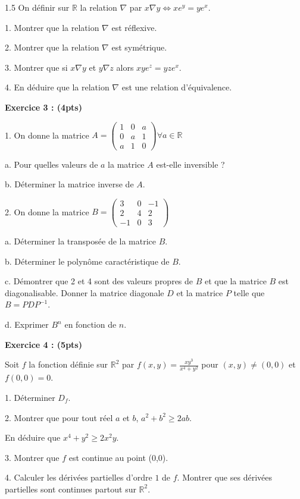 \documentclass[12pt]{article}
\begin{document}
\begin{spacing}{1.5}
On définir sur $\mathbb{R}$ la relation $\nabla$ par $x\nabla y\Longleftrightarrow xe^y=ye^x$.

1. Montrer que la relation $\nabla$ est réflexive.

2. Montrer que la relation $\nabla$ est symétrique.

3. Montrer que si $x\nabla y$ et $y\nabla z$ alors $x	ye^z = yze^x$.

4. En déduire que la relation $\nabla$ est une relation d'équivalence.

\textbf{Exercice 3 : (4pts)}

1. On donne la matrice $A=\begin{pmatrix}
1 & 0 & a \\ 
0 & a & 1 \\ 
a & 1 & 0
\end{pmatrix} \forall a\in \mathbb{R}$

a. Pour quelles valeurs de $a$ la matrice $A$ est-elle inversible ?

b. Déterminer la matrice inverse de $A$.

2. On donne la matrice $B=\begin{pmatrix}
3 & 0 & -1 \\ 
2 & 4 & 2 \\ 
-1 & 0 & 3
\end{pmatrix}$  

a. Déterminer la transposée de la matrice $B$.

b. Déterminer le polynôme caractéristique de $B$.

c. Démontrer que 2 et 4 sont des valeurs propres de $B$ et que la matrice $B$ est diagonalisable. Donner la matrice diagonale $D$ et la matrice $P$ telle que $B=PDP^{-1}$.

d. Exprimer $B^n$ en fonction de $n$.

\textbf{Exercice 4 : (5pts)}

Soit $f$ la fonction définie sur $\mathbb{R}^2$ par $f(x,y) = \frac{xy^3}{x^4 + y^2}$ pour $(x,y)\neq(0,0)$ et $f(0,0) = 0$.

1. Déterminer $D_f$.

2. Montrer que pour tout réel $a$ et $b$, $a^2 + b^2\geq 2ab$. 

En déduire que $x^4+y^2\geq 2x^2y$. 


3. Montrer que $f$ est continue au point (0,0).

4. Calculer les dérivées partielles d'ordre $1$ de $f$. Montrer que ses dérivées partielles sont continues partout sur $\mathbb{R}^2$.



\end{spacing}
\end{document}
